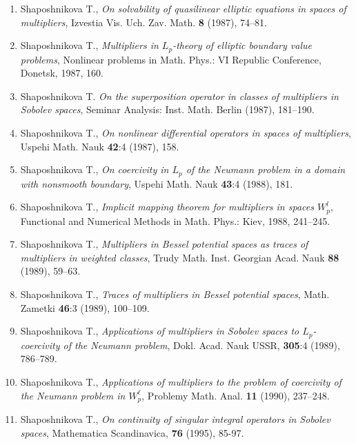 \documentclass{article}
\begin{document}
\begin{enumerate}
\item Shaposhnikova T., {\it On solvability of quasilinear elliptic
equations in spaces
of multipliers}, Izvestia Vis. Uch. Zav. Math. {\bf 8} (1987), 74--81.

\item Shaposhnikova T., {\it Multipliers in $L_p$-theory of elliptic
boundary value
problems}, Nonlinear problems in Math. Phys.: VI Republic Conference,
Donetsk, 1987, 160.

\item Shaposhnikova T. {\it On the superposition operator in classes
of multipliers in
Sobolev spaces}, Seminar Analysis: Inst. Math. Berlin (1987),
181--190.

\item Shaposhnikova T., {\it On nonlinear differential operators in
spaces of
multipliers}, Uspehi Math. Nauk {\bf 42}:4 (1987), 158.

\item Shaposhnikova T., {\it On coercivity in $L_p$ of the Neumann
problem in a domain
with nonsmooth boundary}, Uspehi Math. Nauk {\bf 43}:4 (1988), 181.

\item Shaposhnikova T., {\it Implicit mapping theorem for multipliers
in spaces $W_p^l$},
Functional and Numerical Methods in Math. Phys.: Kiev, 1988, 241--245.

\item Shaposhnikova T., {\it Multipliers in Bessel potential spaces
as traces of
multipliers in weighted classes}, Trudy Math. Inst. Georgian Acad.
Nauk
{\bf 88} (1989), 59--63.

\item Shaposhnikova T., {\it Traces of multipliers in Bessel
potential spaces}, Math.
Zametki {\bf 46}:3 (1989), 100--109.

\item Shaposhnikova T., {\it Applications of multipliers in Sobolev
spaces to
$L_p$-coercivity of the Neumann problem}, Dokl. Acad. Nauk USSR,
{\bf 305}:4 (1989), 786--789.

\item Shaposhnikova T., {\it Applications of multipliers to the
problem of coercivity of
the Neumann problem in $W^\ell_p$}, Problemy Math. Anal. {\bf 11}
(1990), 237--248.

\item Shaposhnikova T., {\it On continuity of singular integral
operators in Sobolev spaces},
Mathematica Scandinavica, {\bf 76} (1995), 85-97.


\end{enumerate}
\end{document}
